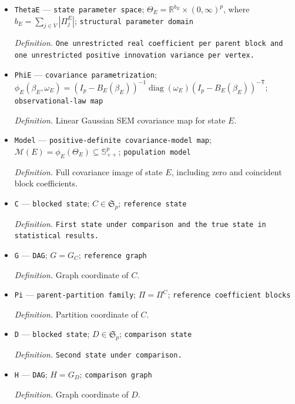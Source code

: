 \documentclass{article}
\begin{document}
\begin{itemize}
  \par\smallskip\noindent\emph{Definition.} \texttt{Unrestricted target-\allowbreak{}specific innovation variances.}
  \item \texttt{ThetaE} --- \texttt{state parameter space}; \(\Theta_E=\mathbb R^{b_E}\times(0,\infty)^p\), where \(b_E=\sum_{j\in V}|\Pi^E_j|\); \texttt{structural parameter domain}
  \par\smallskip\noindent\emph{Definition.} \texttt{One unrestricted real coefficient per parent block and one unrestricted positive innovation variance per vertex.}
  \item \texttt{PhiE} --- \texttt{covariance parametrization}; \(\phi_E(\beta_E,\omega_E)=(I_p-B_E(\beta_E))^{-1}\operatorname{diag}(\omega_E)(I_p-B_E(\beta_E))^{-\mathsf T}\); \texttt{observational-\allowbreak{}law map}
  \par\smallskip\noindent\emph{Definition.} Linear Gaussian SEM covariance map for state \(E\).
  \item \texttt{Model} --- \texttt{positive-\allowbreak{}definite covariance-\allowbreak{}model map}; \(\mathcal M(E)=\phi_E(\Theta_E)\subseteq\mathbb S^p_{++}\); \texttt{population model}
  \par\smallskip\noindent\emph{Definition.} Full covariance image of state \(E\), including zero and coincident block coefficients.
  \item \texttt{C} --- \texttt{blocked state}; \(C\in\mathfrak S_p\); \texttt{reference state}
  \par\smallskip\noindent\emph{Definition.} \texttt{First state under comparison and the true state in statistical results.}
  \item \texttt{G} --- \texttt{DAG}; \(G=G_C\); \texttt{reference graph}
  \par\smallskip\noindent\emph{Definition.} Graph coordinate of \(C\).
  \item \texttt{Pi} --- \texttt{parent-\allowbreak{}partition family}; \(\Pi=\Pi^C\); \texttt{reference coefficient blocks}
  \par\smallskip\noindent\emph{Definition.} Partition coordinate of \(C\).
  \item \texttt{D} --- \texttt{blocked state}; \(D\in\mathfrak S_p\); \texttt{comparison state}
  \par\smallskip\noindent\emph{Definition.} \texttt{Second state under comparison.}
  \item \texttt{H} --- \texttt{DAG}; \(H=G_D\); \texttt{comparison graph}
  \par\smallskip\noindent\emph{Definition.} Graph coordinate of \(D\).

\end{itemize}
\end{document}
